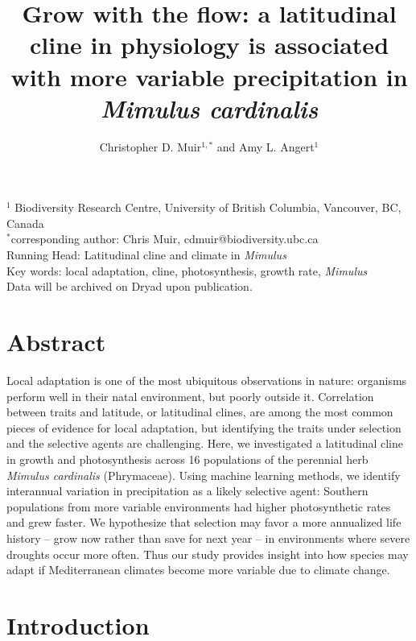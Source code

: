 \documentclass[11pt, oneside]{article}
\title{Grow with the flow: a latitudinal cline in physiology is associated with more variable precipitation in \textit{Mimulus cardinalis}}
\author{Christopher D. Muir$^{1,*}$ and Amy L. Angert$^1$}
\date{}
\newcommand{\stretchy}{1.5}
\begin{document}

\maketitle

$^1$ Biodiversity Research Centre, University of British Columbia, Vancouver, BC, Canada \\
$^*$corresponding author: Chris Muir, cdmuir@biodiversity.ubc.ca \\

Running Head: Latitudinal cline and climate in \textit{Mimulus} \\

Key words: local adaptation, cline, photosynthesis, growth rate, \textit{Mimulus} \\

Data will be archived on Dryad upon publication. \\

\clearpage


\setstretch{\stretchy}
\linenumbers

\section*{Abstract}

Local adaptation is one of the most ubiquitous observations in nature: organisms perform well in their natal environment, but poorly outside it. Correlation between traits and latitude, or latitudinal clines, are among the most common pieces of evidence for local adaptation, but identifying the traits under selection and the selective agents are challenging. Here, we investigated a latitudinal cline in growth and photosynthesis across 16 populations of the perennial herb \textit{Mimulus cardinalis} (Phrymaceae). Using machine learning methods, we identify interannual variation in precipitation as a likely selective agent: Southern populations from more variable environments had higher photosynthetic rates and grew faster. We hypothesize that selection may favor a more annualized life history -- grow now rather than save for next year -- in environments where severe droughts occur more often. Thus our study provides insight into how species may adapt if Mediterranean climates become more variable due to climate change.

\section*{Introduction}
\end{document}

